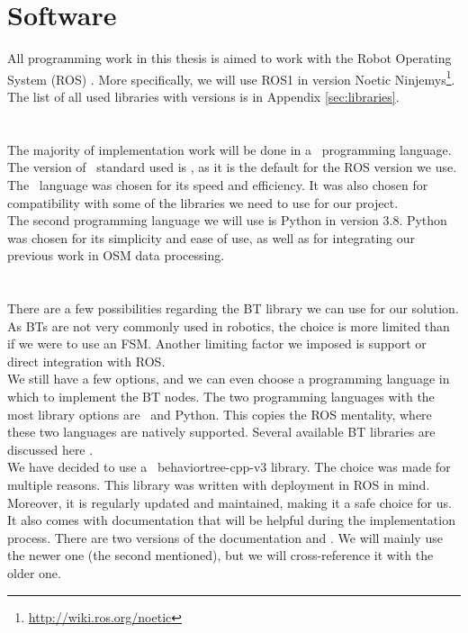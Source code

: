\section{Software}
    All programming work in this thesis is aimed to work with the Robot Operating System (ROS) \cite{ROS}. More specifically, we will use ROS1 in version Noetic Ninjemys\footnote{\url{http://wiki.ros.org/noetic}}.\\
    The list of all used libraries with versions is in Appendix \ref{sec:libraries}.\\\\
    \\
        The majority of implementation work will be done in a \CC\ programming language. The version of \CC\ standard used is , as it is the default for the ROS version we use.\\
        The \CC\ language was chosen for its speed and efficiency. It was also chosen for compatibility with some of the libraries we need to use for our project.\\
        The second programming language we will use is Python in version 3.8. Python was chosen for its simplicity and ease of use, as well as for integrating our previous work in OSM data processing.\\\\
    \\
        There are a few possibilities regarding the BT library we can use for our solution. As BTs are not very commonly used in robotics, the choice is more limited than if we were to use an FSM. Another limiting factor we imposed is support or direct integration with ROS.\\
        We still have a few options, and we can even choose a programming language in which to implement the BT nodes. The two programming languages with the most library options are \CC\ and Python. This copies the ROS mentality, where these two languages are natively supported. Several available BT libraries are discussed here \cite{BT_FSM}.\\
        We have decided to use a \CC\ behaviortree-cpp-v3 library. The choice was made for multiple reasons. This library was written with deployment in ROS in mind. Moreover, it is regularly updated and maintained, making it a safe choice for us. It also comes with documentation that will be helpful during the implementation process. There are two versions of the documentation \cite{BT_docs} and \cite{BT_docs_new}. We will mainly use the newer one (the second mentioned), but we will cross-reference it with the older one.\\
